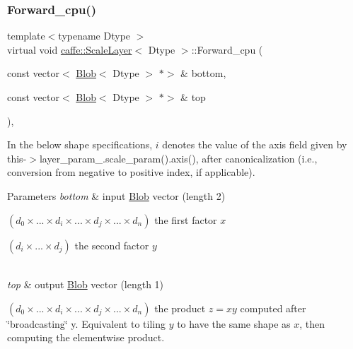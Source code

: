 \subsubsection{\texorpdfstring{Forward\+\_\+cpu()}{Forward\_cpu()}\hspace{0.1cm}{\footnotesize\ttfamily [1/2]}}
{\footnotesize\ttfamily template$<$typename Dtype $>$ \\
virtual void \mbox{\hyperlink{classcaffe_1_1_scale_layer}{caffe\+::\+Scale\+Layer}}$<$ Dtype $>$\+::Forward\+\_\+cpu (\begin{DoxyParamCaption}\item[{const vector$<$ \mbox{\hyperlink{classcaffe_1_1_blob}{Blob}}$<$ Dtype $>$ $\ast$$>$ \&}]{bottom,  }\item[{const vector$<$ \mbox{\hyperlink{classcaffe_1_1_blob}{Blob}}$<$ Dtype $>$ $\ast$$>$ \&}]{top }\end{DoxyParamCaption})\hspace{0.3cm}{\ttfamily [protected]}, {\ttfamily [virtual]}}

In the below shape specifications, $ i $ denotes the value of the {\ttfamily axis} field given by {\ttfamily this-\/$>$layer\+\_\+param\+\_\+.\+scale\+\_\+param().axis()}, after canonicalization (i.\+e., conversion from negative to positive index, if applicable).


\begin{DoxyParams}{Parameters}
{\em bottom} & input \mbox{\hyperlink{classcaffe_1_1_blob}{Blob}} vector (length 2)
\begin{DoxyEnumerate}
\item $ (d_0 \times ... \times d_i \times ... \times d_j \times ... \times d_n) $ the first factor $ x $
\item $ (d_i \times ... \times d_j) $ the second factor $ y $ 
\end{DoxyEnumerate}\\
\hline
{\em top} & output \mbox{\hyperlink{classcaffe_1_1_blob}{Blob}} vector (length 1)
\begin{DoxyEnumerate}
\item $ (d_0 \times ... \times d_i \times ... \times d_j \times ... \times d_n) $ the product $ z = x y $ computed after \char`\"{}broadcasting\char`\"{} y. Equivalent to tiling $ y $ to have the same shape as $ x $, then computing the elementwise product. 
\end{DoxyEnumerate}\\
\hline
\end{DoxyParams}


